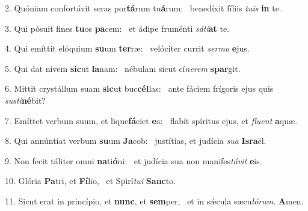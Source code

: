 2. Quóniam confortávit seras por\textbf{tá}rum tu\textbf{á}rum: \ast\  benedíxit fíliis \textit{tu}\textit{is} \textbf{in} te.\

3. Qui pósuit fines \textbf{tu}os \textbf{pa}cem: \ast\  et ádipe fruménti \textit{sá}\textit{ti}\textbf{at} te.\

4. Qui emíttit elóquium \textbf{su}um \textbf{ter}ræ: \ast\  velóciter currit \textit{ser}\textit{mo} \textbf{e}jus.\

5. Qui dat nivem \textbf{sic}ut \textbf{la}nam: \ast\  nébulam sicut cí\textit{ne}\textit{rem} \textbf{spar}git.\

6. Mittit crystállum suam \textbf{sic}ut buc\textbf{cél}las: \ast\  ante fáciem frígoris ejus quis \textit{sus}\textit{ti}\textbf{né}bit?\

7. Emíttet verbum suum, et lique\textbf{fá}ciet \textbf{e}a: \ast\  flabit spíritus ejus, et \textit{flu}\textit{ent} \textbf{a}quæ.\

8. Qui annúntiat verbum \textbf{su}um \textbf{Ja}cob: \ast\  justítias, et judícia \textit{su}\textit{a} \textbf{Is}\textbf{ra}ël.\

9. Non fecit táliter omni \textbf{na}ti\textbf{ó}ni: \ast\  et judícia sua non manifes\textit{tá}\textit{vit} \textbf{e}is.\

10. Glória \textbf{Pa}tri, et \textbf{Fí}lio, \ast\  et Spirí\textit{tu}\textit{i} \textbf{Sanc}to.\

11. Sicut erat in princípio, et \textbf{nunc}, et \textbf{sem}per, \ast\  et in sǽcula sæcu\textit{ló}\textit{rum}. \textbf{A}men.\

